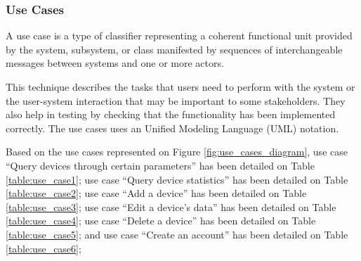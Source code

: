 \subsubsection{Use Cases}

A use case is a type of classifier representing a
coherent functional unit provided by the system, subsystem, or class manifested
by sequences of interchangeable messages between systems and one or more
actors.

This technique describes the tasks that users need to perform with
the system or the user-system interaction that may be important to some
stakeholders. They also help in testing by checking that the functionality
has been implemented correctly. The use cases uses an Unified Modeling
Language (UML) notation.

Based on the use cases represented on Figure \ref{fig:use_cases_diagram},
use case ``Query devices through certain parameters'' has been detailed on Table \ref{table:use_case1};
use case ``Query device statistics'' has been detailed on Table \ref{table:use_case2};
use case ``Add a device'' has been detailed on Table \ref{table:use_case3};
use case ``Edit a device's data'' has been detailed on Table \ref{table:use_case4};
use case ``Delete a device'' has been detailed on Table \ref{table:use_case5};
and use case ``Create an account'' has been detailed on Table \ref{table:use_case6};

